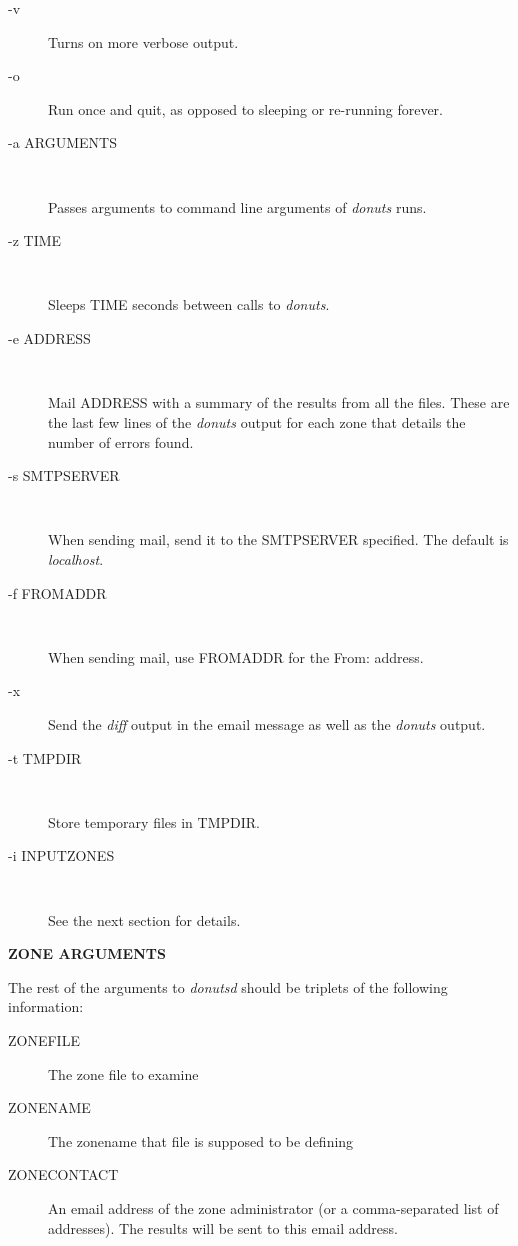 \begin{description}

\item [-v] Turns on more verbose output.

\item [-o] Run once and quit, as opposed to sleeping or re-running forever.

\item [-a ARGUMENTS]\verb" "

Passes arguments to command line arguments of {\it donuts} runs.

\item [-z TIME]\verb" "

Sleeps TIME seconds between calls to {\it donuts}.

\item [-e ADDRESS]\verb" "

Mail ADDRESS with a summary of the results from all the files.
These are the last few lines of the {\it donuts} output for each zone that
details the number of errors found.

\item [-s SMTPSERVER]\verb" "

When sending mail, send it to the SMTPSERVER specified.  The default
is {\it localhost}.

\item [-f FROMADDR]\verb" "

When sending mail, use FROMADDR for the From: address.

\item [-x] Send the {\it diff} output in the email message as well as
the {\it donuts} output.

\item [-t TMPDIR]\verb" "

Store temporary files in TMPDIR.

\item [-i INPUTZONES]\verb" "

See the next section for details.

\end{description}

{\bf ZONE ARGUMENTS}

The rest of the arguments to {\it donutsd} should be triplets of the
following information:

\begin{description}

\item [ZONEFILE] The zone file to examine

\item [ZONENAME] The zonename that file is supposed to be defining

\item [ZONECONTACT] An email address of the zone administrator (or a
comma-separated list of addresses).  The results will be sent to this
email address.

\end{description}

